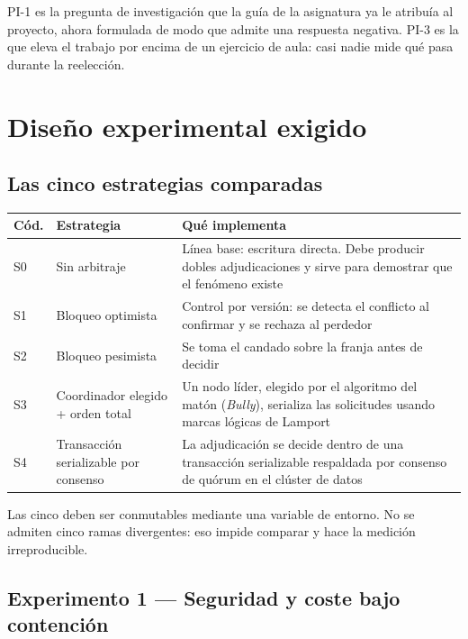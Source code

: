 \documentclass[11pt,a4paper]{article}
\begin{document}
PI-1 es la pregunta de investigación que la guía de la asignatura ya le atribuía al proyecto, ahora formulada de modo que admite una respuesta negativa. PI-3 es la que eleva el trabajo por encima de un ejercicio de aula: casi nadie mide qué pasa durante la reelección.

\section{Diseño experimental exigido}

\subsection{Las cinco estrategias comparadas}

\begin{center}
	\small
	\begin{tabular}{@{}p{1.1cm}p{4.6cm}p{9.3cm}@{}}
		\toprule
		\textbf{Cód.} & \textbf{Estrategia} & \textbf{Qué implementa} \\
		\midrule
		S0 & Sin arbitraje & Línea base: escritura directa. Debe producir dobles adjudicaciones y sirve para demostrar que el fenómeno existe \\
		\addlinespace
		S1 & Bloqueo optimista & Control por versión: se detecta el conflicto al confirmar y se rechaza al perdedor \\
		\addlinespace
		S2 & Bloqueo pesimista & Se toma el candado sobre la franja antes de decidir \\
		\addlinespace
		S3 & Coordinador elegido + orden total & Un nodo líder, elegido por el algoritmo del matón (\emph{Bully}), serializa las solicitudes usando marcas lógicas de Lamport \cite{lamport1978time} \\
		\addlinespace
		S4 & Transacción serializable por consenso & La adjudicación se decide dentro de una transacción serializable respaldada por consenso de quórum en el clúster de datos \\
		\bottomrule
	\end{tabular}
\end{center}

Las cinco deben ser conmutables mediante una variable de entorno. No se admiten cinco ramas divergentes: eso impide comparar y hace la medición irreproducible.

\subsection{Experimento 1 --- Seguridad y coste bajo contención}
\end{document}
